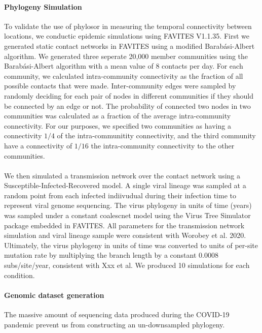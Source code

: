 \documentclass[12pt, a4paper]{article}
\begin{document}
    \paragraph{Phylogeny Simulation}
    To validate the use of phylosor in measuring the temporal connectivity between locations, we conductic epidemic simulations using FAVITES V1.1.35.
    First we generated static contact networks in FAVITES using a modified Barabási-Albert algorithm.
    We generated three seperate 20,000 member communities using the Barabási-Albert algorithm with a mean value of 8 contacts per day.
    For each community, we calculated intra-community connectivity as the fraction of all possible contacts that were made.
    Inter-community edges were sampled by randomly deciding for each pair of nodes in different communities if they should be connected by an edge or not.
    The probability of connected two nodes in two communities was calculated as a fraction of the average intra-community connectivity.
    For our purposes, we specified two communities as having a connectivity \(1/4\) of the intra-communitity connectivity, and the third community have a connectivity of \(1/16\) the intra-community connectivity to the other communities.
    \\~\\
    We then simulated a transmission network over the contact network using a Susceptible-Infected-Recovered model.
    A single viral lineage was sampled at a random point from each infected indiivudual during their infection time to represent viral genome sequencing.
    The virus phylogeny in units of time (years) was sampled under a constant coalescnet model using the Virus Tree Simulator package embedded in FAVITES.
    All parameters for the transmission network simulation and viral lineage sample were consistent with Worobey et al. 2020.
    Ultimately, the virus phylogeny in units of time was converted to units of per-site mutation rate by multiplying the branch length by a constant 0.0008 subs/site/year, consistent with Xxx et al.
    We produced 10 simulations for each condition.

    \paragraph{Genomic dataset generation}
    The massive amount of sequencing data produced during the COVID-19 pandemic prevent us from constructing an un-downsampled phylogeny.
\end{document}
